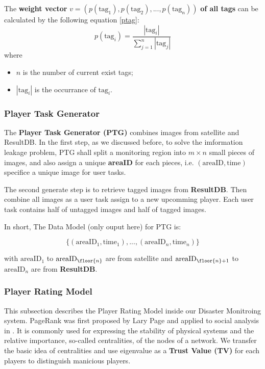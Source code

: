   \begin{definition}
  \label{def:weightv}
  The \textbf{weight vector} $v = (p(\text{tag}_1), p(\text{tag}_2), ..., p(\text{tag}_n))$ \textbf{of all tags} 
  can be calculated by the following equation \ref{ptag}:
  \begin{equation}
  \label{eq:ptag}
  p(\text{tag}_i) = \frac{|\text{tag}_i|}{\sum_{j=1}^{n}{|\text{tag}_j|}}
  \end{equation}
  where
  \begin{itemize}
  \item $n$ is the number of current exist tags;
  \item $|\text{tag}_i|$ is the occurrance of $\text{tag}_i$.
  \end{itemize}
  \end{definition}

\subsubsection{Player Task Generator}

  The \textbf{Player Task Generator (PTG)} combines images from satellite and ResultDB. 
  In the first step, as we discussed before, to solve the imformation leakage problem,
  PTG shall split a monitoring region into $m\times n$ small pieces of images, and also assign a 
  unique \textbf{areaID} for each pieces, i.e. $(\text{areaID}, \text{time})$ 
  specifice a unique image for user tasks. 

  The second generate step is to retrieve tagged images from \textbf{ResultDB}. Then combine
  all images as a user task assign to a new upcomming player. Each user task contains 
  half of untagged images and half of tagged images.

  In short, The Data Model (only ouput here) for PTG is:

  \[
  \{(\text{areaID}_1, \text{time}_1), ..., (\text{areaID}_n, \text{time}_n)\}
  \]

  with $\text{areaID}_1$ to $\text{areaID}_{\floor{n}}$ are from satellite and 
  $\text{areaID}_{\floor{n}+1}$ to $\text{areaID}_{n}$ are from \textbf{ResultDB}.

\subsubsection{Player Rating Model}

  This subsection describes the Player Rating Model inside our Disaster Monitroing system.
  PageRank was first proposed by Lary Page \cite{page1999pagerank} and applied to social analysis in \cite{bonacich2001eigenvector}. 
  It is commonly used for expressing the stability of physical systems and the relative importance, 
  so-called centralities, of the nodes of a network. We transfer the basic idea of centralities 
  and use eigenvalue as a \textbf{Trust Value (TV)} for each players to distinguish manicious players.

